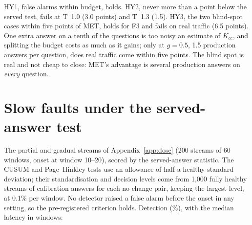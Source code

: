 \documentclass[11pt]{article}
\begin{document}
\begin{center}\small
\setlength{\tabcolsep}{3pt}
\end{center}

\noindent HY1, false alarms within budget, holds. HY2, never more than a point below
the served test, fails at T~1.0 (3.0 points) and T~1.3 (1.5). HY3, the two
blind-spot cases within five points of MET, holds for F3 and fails on real traffic
(6.5 points). One extra answer on a tenth of the questions is too noisy an estimate
of $K_{cc}$, and splitting the budget costs as much as it gains; only at $g=0.5$,
1.5 production answers per question, does real traffic come within five points.
The blind spot is real and not cheap to close: MET's advantage is several
production answers on \emph{every} question.

\section{Slow faults under the served-answer test}
\label{app:slow}

The partial and gradual streams of Appendix~\ref{app:dose} (200 streams of 60
windows, onset at window 10--20), scored by the served-answer statistic. The
CUSUM and Page--Hinkley tests use an allowance of half a healthy standard deviation;
their standardisation and decision levels come from 1{,}000 fully healthy streams
of calibration answers for each no-change pair, keeping the largest level, at 0.1\%
per window. No detector raised a false alarm before the onset in any setting, so
the pre-registered criterion holds. Detection (\%), with the median latency in windows:
\end{document}
